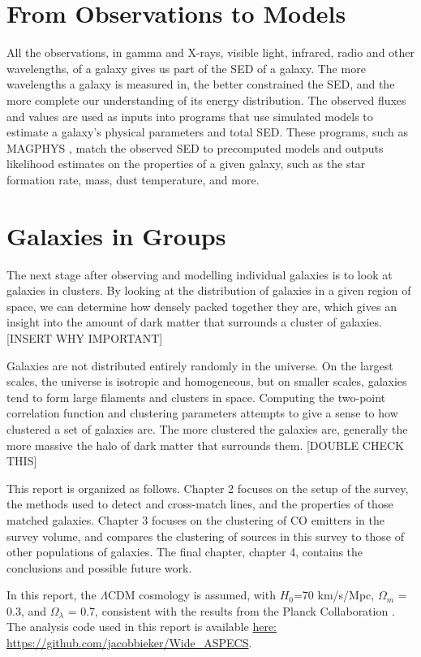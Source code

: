 \documentclass[twoside,single]{lion-msc}
\begin{document}
\section{From Observations to Models}

All the observations, in gamma and X-rays, visible light, infrared, radio and other wavelengths, of a galaxy gives us part of the SED of a galaxy. The more wavelengths a galaxy is measured in, the better constrained the SED, and the more complete our understanding of its energy distribution. The observed fluxes and values are used as inputs into programs that use simulated models to estimate a galaxy's physical parameters and total SED. These programs, such as MAGPHYS \cite{da2008simple, da2015alma}, match the observed SED to precomputed models and outputs likelihood estimates on the properties of a given galaxy, such as the star formation rate, mass, dust temperature, and more.

\section{Galaxies in Groups}

The next stage after observing and modelling individual galaxies is to look at galaxies in clusters. By looking at the distribution of galaxies in a given region of space, we can determine how densely packed together they are, which gives an insight into the amount of dark matter that surrounds a cluster of galaxies. [INSERT WHY IMPORTANT]

Galaxies are not distributed entirely randomly in the universe. On the largest scales, the universe is isotropic and homogeneous, but on smaller scales, galaxies tend to form large filaments and clusters in space. Computing the two-point correlation function and clustering parameters attempts to give a sense to how clustered a set of galaxies are. The more clustered the galaxies are, generally the more massive the halo of dark matter that surrounds them. [DOUBLE CHECK THIS]

This report is organized as follows. Chapter 2 focuses on the setup of the survey, the methods used to detect and cross-match lines, and the properties of those matched galaxies. Chapter 3 focuses on the clustering of CO emitters in the survey volume, and compares the clustering of sources in this survey to those of other populations of galaxies. The final chapter, chapter 4, contains the conclusions and possible future work. 

In this report, the $\Lambda$CDM cosmology is assumed, with $H_0$=70 km/s/Mpc, $\Omega_m$ = 0.3, and $\Omega_{\lambda}$ = 0.7, consistent with the results from the Planck Collaboration \cite{ade2016planck}. The analysis code used in this report is available \href{https://github.com/jacobbieker/Wide\_ASPECS}{here: https://github.com/jacobbieker/Wide\_ASPECS}. 
\end{document}
